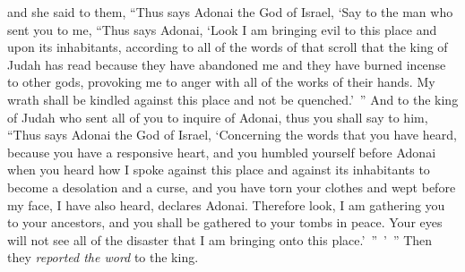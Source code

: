 \begin{biblechapter}
\verse and she said to them, “Thus says Adonai the God of Israel, ‘Say to the man who sent you to me,
\verse “Thus says Adonai, ‘Look I am bringing evil to this place and upon its inhabitants, according to all of the words of that scroll that the king of Judah has read
\verse because they have abandoned me and they have burned incense to other gods, provoking me to anger with all of the works of their hands. My wrath shall be kindled against this place and not be quenched.’ ”
\verse And to the king of Judah who sent all of you to inquire of Adonai, thus you shall say to him, “Thus says Adonai the God of Israel, ‘Concerning the words that you have heard,
\verse because you have a responsive heart, and you humbled yourself before Adonai when you heard how I spoke against this place and against its inhabitants to become a desolation and a curse, and you have torn your clothes and wept before my face, I have also heard, declares Adonai.
\verse Therefore look, I am gathering you to your ancestors, and you shall be gathered to your tombs in peace. Your eyes will not see all of the disaster that I am bringing onto this place.’ ” ’ ” Then they \textit{reported the word} to the king.
\end{biblechapter}

